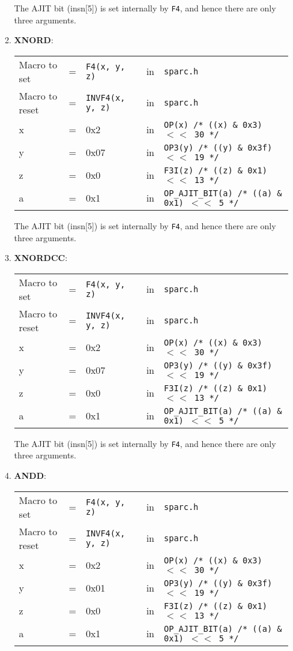 \begin{itemize}
\begin{enumerate}
    The AJIT bit  (insn[5]) is set internally by  \texttt{F4}, and hence
    there are only three arguments.

  \item \textbf{XNORD}:\\
    \begin{tabular}[h]{lclcl}
      Macro to set  &=& \texttt{F4(x, y, z)} &in& \texttt{sparc.h}     \\
      Macro to reset  &=& \texttt{INVF4(x, y, z)} &in& \texttt{sparc.h}     \\
      x &=& 0x2      &in& \texttt{OP(x)  /* ((x) \& 0x3)  $<<$ 30 */} \\
      y &=& 0x07     &in& \texttt{OP3(y) /* ((y) \& 0x3f) $<<$ 19 */} \\
      z &=& 0x0      &in& \texttt{F3I(z) /* ((z) \& 0x1)  $<<$ 13 */} \\
      a &=& 0x1      &in& \texttt{OP\_AJIT\_BIT(a) /* ((a) \& 0x1)  $<<$ 5 */}
    \end{tabular}

    The AJIT bit  (insn[5]) is set internally by  \texttt{F4}, and hence
    there are only three arguments.
    
  \item \textbf{XNORDCC}:\\
    \begin{tabular}[h]{lclcl}
      Macro to set  &=& \texttt{F4(x, y, z)} &in& \texttt{sparc.h}     \\
      Macro to reset  &=& \texttt{INVF4(x, y, z)} &in& \texttt{sparc.h}     \\
      x &=& 0x2      &in& \texttt{OP(x)  /* ((x) \& 0x3)  $<<$ 30 */} \\
      y &=& 0x07     &in& \texttt{OP3(y) /* ((y) \& 0x3f) $<<$ 19 */} \\
      z &=& 0x0      &in& \texttt{F3I(z) /* ((z) \& 0x1)  $<<$ 13 */} \\
      a &=& 0x1      &in& \texttt{OP\_AJIT\_BIT(a) /* ((a) \& 0x1)  $<<$ 5 */}
    \end{tabular}

    The AJIT bit  (insn[5]) is set internally by  \texttt{F4}, and hence
    there are only three arguments.
    
  \item \textbf{ANDD}:\\
    \begin{tabular}[h]{lclcl}
      Macro to set  &=& \texttt{F4(x, y, z)} &in& \texttt{sparc.h}     \\
      Macro to reset  &=& \texttt{INVF4(x, y, z)} &in& \texttt{sparc.h}     \\
      x &=& 0x2      &in& \texttt{OP(x)  /* ((x) \& 0x3)  $<<$ 30 */} \\
      y &=& 0x01     &in& \texttt{OP3(y) /* ((y) \& 0x3f) $<<$ 19 */} \\
      z &=& 0x0      &in& \texttt{F3I(z) /* ((z) \& 0x1)  $<<$ 13 */} \\
      a &=& 0x1      &in& \texttt{OP\_AJIT\_BIT(a) /* ((a) \& 0x1)  $<<$ 5 */}
    \end{tabular}


\end{enumerate}
\end{itemize}
